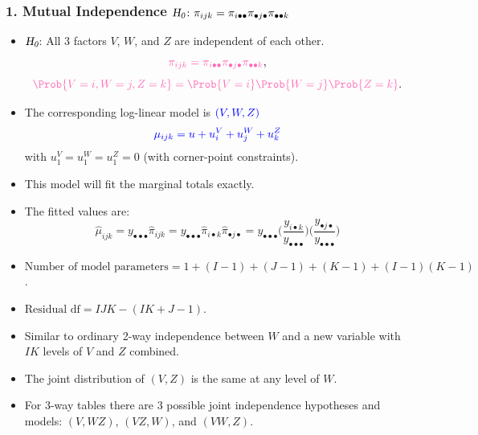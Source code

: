 \documentclass[oneside]{book}\usepackage[]{graphicx}\usepackage[svgnames]{xcolor}
\let\log\relax%
\newcommand{\HN}{\textsl{H}_{\textsl{0}}}%
\begin{document}
\subsubsection*{1. Mutual Independence $\HN\colon \pi_{ijk}=\pi_{i\bullet\bullet}\pi_{\bullet j\bullet}\pi_{\bullet\bullet k}$}
\begin{itemize}
      \item $ \HN $: All 3 factors $V$, $W$, and $Z$ are independent of each other.
            \[ \textcolor{HotPink}{\pi_{ijk}=\pi_{i\bullet\bullet}\pi_{\bullet j\bullet}\pi_{\bullet\bullet k}}, \]
            \[ \textcolor{HotPink}{\Prob{V=i,W=j,Z=k}=\Prob{V=i}\Prob{W=j}\Prob{Z=k}}. \]
      \item The corresponding log-linear model is $ \textcolor{Blue}{(V,W,Z)} $
            \[ \textcolor{Blue}{\log{\mu}_{ijk}=u+u_i^V+u_j^W+u_k^Z} \]
            with $ u_1^V=u_1^W=u_1^Z=0 $ (with corner-point constraints).
      \item This model will fit the marginal totals exactly.
      \item The fitted values are:
            \[ \hat{\mu}_{i j k
                  }=y_{\bullet\bullet\bullet} \hat{\pi}_{ijk}
                  =y_{\bullet\bullet\bullet} \hat{\pi}_{i\bullet k} \hat{\pi}_{\bullet j\bullet}
                  =y_{\bullet\bullet\bullet}\biggl(\frac{y_{i\bullet k}}{y_{\bullet\bullet\bullet}}\biggr)
                  \biggl(\frac{y_{\bullet j\bullet}}{y_{\bullet\bullet\bullet}}\biggr) \]
      \item $ \text{Number of model parameters}=1+(I-1)+(J-1)+(K-1)+(I-1)(K-1) $.
      \item $ \text{Residual df}=IJK-(IK+J-1) $.
      \item Similar to ordinary 2-way independence between $W$ and a new variable with $IK$
            levels of $V$ and $Z$ combined.
      \item The joint distribution of $(V,Z)$ is the same at any level of $W$.
      \item For 3-way tables there are 3 possible joint independence hypotheses and models:
            $(V,WZ)$, $(VZ,W)$, and $(VW,Z)$.
\end{itemize}
\end{document}
